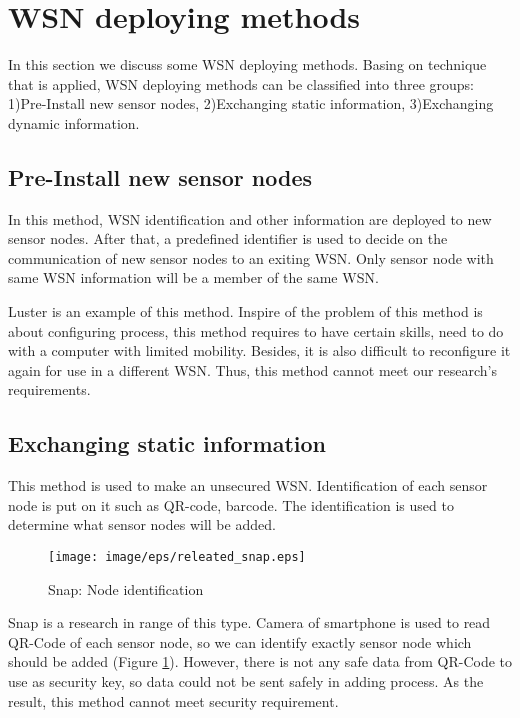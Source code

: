 \section{WSN deploying methods}\label{sec:related_setting}

In this section we discuss some WSN deploying methods. Basing on technique that is applied, WSN deploying methods can be classified into three groups: 1)Pre-Install new sensor nodes, 2)Exchanging static information, 3)Exchanging dynamic information.

\subsection{Pre-Install new sensor nodes}

In this method, WSN identification and other information are deployed to new sensor nodes. After that, a predefined identifier is used to decide on the communication of new sensor nodes to an exiting WSN. Only sensor node with same WSN information will be a member of the same WSN. 

Luster \cite{Selavo:2007:LWS:1322263.1322274} is an example of this method. Inspire of the problem of this method is about configuring process, this method requires to have certain skills, need to do with a computer with limited mobility. Besides, it is also difficult to reconfigure it again for use in a different WSN. Thus, this method cannot meet our research's requirements.

\subsection{Exchanging static information}

This method is used to make an unsecured WSN. Identification of each sensor node is put on it such as QR-code, barcode. The identification is used to determine what sensor nodes will be added. 

\begin{figure}[tb]
\centering
\texttt{[image: image/eps/releated\_snap.eps]}
\caption{Snap: Node identification}
\label{fig:releated_snap}
\end{figure}

Snap \cite{Duquennoy:2011:DSR:2070942.2071012} is a research in range of this type. Camera of smartphone is used to read QR-Code of each sensor node, so we can identify exactly sensor node which should be added (Figure \ref{fig:releated_snap}). However, there is not any safe data from QR-Code to use as security key, so data could not be sent safely in adding process. As the result, this method cannot meet security requirement. 

